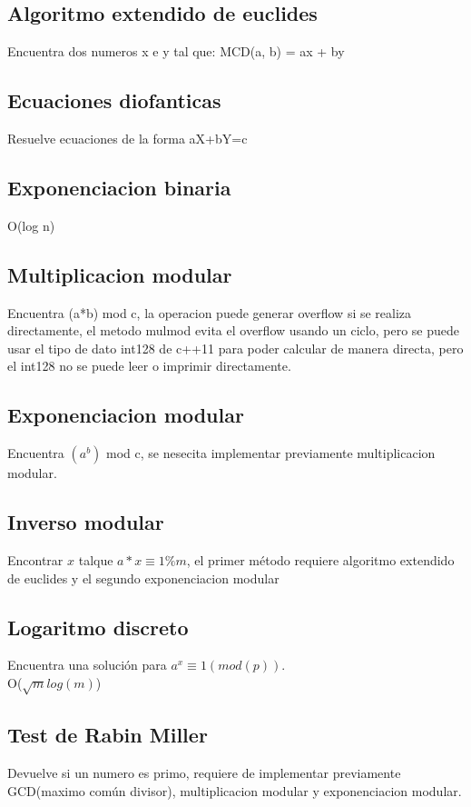 \documentclass[10pt,landscape,twocolumn,letterpaper,twosided]{article}
\newcommand\cppfile[2][]{

}
\begin{document}
			\subsection{Algoritmo extendido de euclides}
			Encuentra dos numeros x e y tal que: MCD(a, b) = ax + by
			\cppfile[5-15]{matematicas/algoritmo_extendido_de_euclides.cpp}
			\subsection{Ecuaciones diofanticas}
			Resuelve ecuaciones de la forma aX+bY=c
			\cppfile[20-38]{matematicas/ecuaciones_diofanticas.cpp}
			\subsection{Exponenciacion binaria}
			O(log n)
			\cppfile[6-13]{matematicas/exponenciacion_binaria.cpp}
			\subsection{Multiplicacion modular}
			Encuentra (a*b) mod c, la operacion puede generar overflow
				si se realiza directamente, el metodo mulmod evita el overflow usando un
				ciclo, pero se puede usar el tipo de dato int128 de c++11 para poder calcular
				de manera directa, pero el int128 no se puede leer o imprimir directamente.
			\cppfile[5-26]{matematicas/multiplicacion_modular.cpp}
			\subsection{Exponenciacion modular}
			Encuentra $(a^b)$ mod c, se nesecita implementar previamente multiplicacion modular.
			\cppfile[16-20]{matematicas/exp_modular.cpp}
			\subsection{Inverso modular}
			Encontrar $x$ talque $a*x \equiv 1\% m$, el primer método requiere algoritmo extendido de euclides y el 
			segundo exponenciacion modular
			\cppfile[34-43]{matematicas/inverso_multiplicativo_modular.cpp}
			\subsection{Logaritmo discreto}
			Encuentra una solución para $a^{x} \equiv 1 (mod(p))$.\\ O($\sqrt{m} log (m)$)
			\cppfile[7-25]{matematicas/logaritmo_discreto.cpp}
			\subsection{Test de Rabin Miller}
			Devuelve si un numero es primo, requiere de implementar previamente GCD(maximo común divisor),
			multiplicacion modular y exponenciacion modular.
			\cppfile[27-50]{matematicas/test_de_rabin_miller.cpp}
\end{document}
